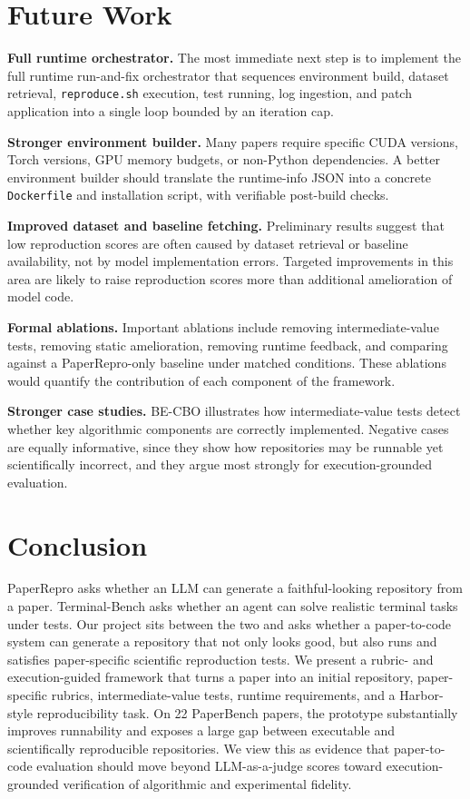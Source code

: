 \documentclass[11pt]{article}
\begin{document}
\section{Future Work}

\textbf{Full runtime orchestrator.} The most immediate next step
is to implement the full runtime run-and-fix orchestrator that
sequences environment build, dataset retrieval,
\texttt{reproduce.sh} execution, test running, log ingestion, and
patch application into a single loop bounded by an iteration
cap.

\textbf{Stronger environment builder.} Many papers require
specific CUDA versions, Torch versions, GPU memory budgets, or
non-Python dependencies. A better environment builder should
translate the runtime-info JSON into a concrete \texttt{Dockerfile}
and installation script, with verifiable post-build checks.

\textbf{Improved dataset and baseline fetching.} Preliminary
results suggest that low reproduction scores are often caused by
dataset retrieval or baseline availability, not by model
implementation errors. Targeted improvements in this area are
likely to raise reproduction scores more than additional
amelioration of model code.

\textbf{Formal ablations.} Important ablations include removing
intermediate-value tests, removing static amelioration, removing
runtime feedback, and comparing against a PaperRepro-only
baseline under matched conditions. These ablations would
quantify the contribution of each component of the framework.

\textbf{Stronger case studies.} BE-CBO illustrates how
intermediate-value tests detect whether key algorithmic
components are correctly implemented. Negative cases are equally
informative, since they show how repositories may be runnable
yet scientifically incorrect, and they argue most strongly for
execution-grounded evaluation.

\section{Conclusion}

PaperRepro asks whether an LLM can generate a faithful-looking
repository from a paper. Terminal-Bench asks whether an agent can
solve realistic terminal tasks under tests. Our project sits
between the two and asks whether a paper-to-code system can
generate a repository that not only looks good, but also runs
and satisfies paper-specific scientific reproduction tests. We
present a rubric- and execution-guided framework that turns a
paper into an initial repository, paper-specific rubrics,
intermediate-value tests, runtime requirements, and a Harbor-style
reproducibility task. On 22 PaperBench papers, the prototype
substantially improves runnability and exposes a large gap between
executable and scientifically reproducible repositories. We view
this as evidence that paper-to-code evaluation should move beyond
LLM-as-a-judge scores toward execution-grounded verification of
algorithmic and experimental fidelity.
\end{document}
